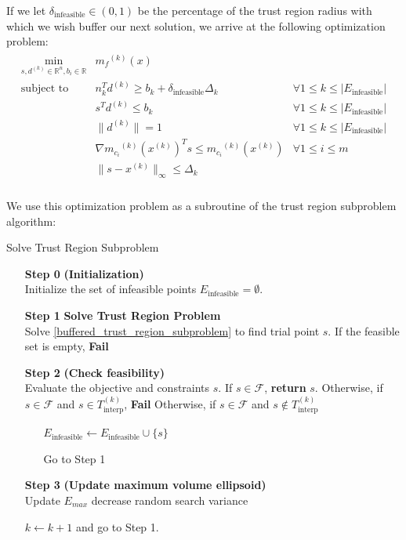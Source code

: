 \documentclass{article}
\theoremstyle{case}
\newcommand{\xk}{{x^{(k)}}}
\newcommand{\Rn}{\mathbb R^n}
\newcommand{\reals}{\mathbb R}
\newcommand{\dk}{\Delta_k}
\newcommand{\mfk}{{{m}_f}^{(k)}}
\newcommand{\mcik}{{{m}_{c_i}}^{(k)}}
\newcommand{\sampletrk}{{T_{\text{interp}}^{(k)}}}
\newcommand{\feasible}{{\mathcal F}}
\newcommand{\trsinfset}{{E_\text{infeasible}}}
\newcommand{\trstol}{{\delta_\text{infeasible}}}
\begin{document}
If we let $\trstol \in (0, 1)$ be the percentage of the trust region radius with which we wish buffer our next solution, 
we arrive at the following optimization problem:
\begin{align}
\label{buffered_trust_region_subproblem}
\begin{array}{ccc}
\min_{s, d^{(k)} \in \Rn, b_i \in \reals}	& \mfk(x) & 	\\
 \mbox{subject to}  & n_k^Td^{(k)} \ge b_k + \trstol \dk& \forall 1 \le k \le |\trsinfset | \\
 & s^T d^{(k)} \le b_k &   \forall 1 \le k \le |\trsinfset |  \\
 & \|d^{(k)}\| = 1 & \forall 1 \le k \le |\trsinfset |	\\
 & \nabla \mcik(\xk) ^T s \le \mcik(\xk) & \forall 1 \le i \le m\\
 & \|s - \xk \|_{\infty} \le \dk & \\
\end{array}
\end{align}

We use this optimization problem as a subroutine of the trust region subproblem algorithm:

\begin{algorithm}[H]
    \caption{Solve Trust Region Subproblem}
    \label{linear_cut_trust_region_subproblem}
    \begin{itemize}
        \item[\textbf{Step 0}] \textbf{(Initialization)} \\
	    Initialize the set of infeasible points $\trsinfset = \emptyset$.
        
        \item[\textbf{Step 1}] \textbf{Solve Trust Region Problem} \\
	    Solve \cref{buffered_trust_region_subproblem} to find trial point $s$.
	    If the feasible set is empty, \textbf{Fail}
        
        \item[\textbf{Step 2}] \textbf{(Check feasibility)} \\
            Evaluate the objective and constraints $s$.
            If $s\in\feasible$, \textbf{return} $s$.
            Otherwise, if $s\in\feasible$ and $s \in \sampletrk$, \textbf{Fail}
	    Otherwise, if $s\in\feasible$ and $s \not \in \sampletrk$ \begin{itemize}
	    	\item[] $\trsinfset \gets \trsinfset \cup \{s\}$
	    	\item[] Go to Step 1
	    \end{itemize}
            
        \item[\textbf{Step 3}] \textbf{(Update maximum volume ellipsoid)} \\
	    Update $E_{max}$
	    decrease random search variance
            
        $k \gets k+1$ and go to Step 1.
    \end{itemize}
\end{algorithm}
\end{document}
